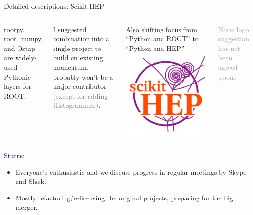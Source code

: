 \documentclass{beamer}
\begin{document}
\begin{frame}{Detailed descriptions: Scikit-HEP}
\vspace{0.5 cm}
\begin{columns}
rootpy, root\_numpy, and Ostap are widely-used Pythonic layers for ROOT.

\vspace{0.2 cm}
I suggested combination into a single project to build on existing momentum, probably won't be a major contributor \textcolor{gray}{(except for adding Histogrammar)}.

\vspace{0.2 cm}
Also shifting focus from ``Python and ROOT'' to ``Python and HEP.''
\scriptsize
\includegraphics[width=\linewidth]{femtocode-logo.png}

\textcolor{darkgray}{Note: logo suggestion has not been agreed upon.}
\end{columns}

\vspace{0.4 cm}
\textcolor{darkblue}{Status:}
\begin{itemize}
\item Everyone's enthusiastic and we discuss progress in regular meetings by Skype and Slack.
\item Mostly refactoring/relicensing the original projects, preparing for the big merger.
\end{itemize}
\end{frame}
\end{document}
